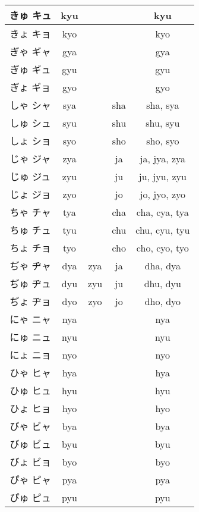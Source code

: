 \documentclass{article}
\begin{document}
\begin{center}
\begin{japanese}
\begin{longtable}{|c|c c c|c|}
                きゅ キュ & kyu &&& kyu \\ \hline
                きょ キョ & kyo &&& kyo \\ \hline
                ぎゃ ギャ & gya &&& gya \\ \hline
                ぎゅ ギュ & gyu &&& gyu \\ \hline
                ぎょ ギョ & gyo &&& gyo \\ \hline
                しゃ シャ & sya && sha & sha, sya \\ \hline
                しゅ シュ & syu && shu & shu, syu \\ \hline
                しょ ショ & syo && sho & sho, syo \\ \hline
                じゃ ジャ & zya && ja & ja, jya, zya \\ \hline
                じゅ ジュ & zyu && ju & ju, jyu, zyu \\ \hline
                じょ ジョ & zyo && jo & jo, jyo, zyo \\ \hline
                ちゃ チャ & tya && cha & cha, cya, tya \\ \hline
                ちゅ チュ & tyu && chu & chu, cyu, tyu \\ \hline
                ちょ チョ & tyo && cho & cho, cyo, tyo \\ \hline
                ぢゃ ヂャ & dya & zya & ja & dha, dya \\ \hline
                ぢゅ ヂュ & dyu & zyu & ju & dhu, dyu \\ \hline
                ぢょ ヂョ & dyo & zyo & jo & dho, dyo \\ \hline
                にゃ ニャ & nya &&& nya \\ \hline
                にゅ ニュ & nyu &&& nyu \\ \hline
                にょ ニョ & nyo &&& nyo \\ \hline
                ひゃ ヒャ & hya &&& hya \\ \hline
                ひゅ ヒュ & hyu &&& hyu \\ \hline
                ひょ ヒョ & hyo &&& hyo \\ \hline
                びゃ ビャ & bya &&& bya \\ \hline
                びゅ ビュ & byu &&& byu \\ \hline
                びょ ビョ & byo &&& byo \\ \hline
                ぴゃ ピャ & pya &&& pya \\ \hline
                ぴゅ ピュ & pyu &&& pyu \\ \hline

\end{longtable}
\end{japanese}
\end{center}
\end{document}
